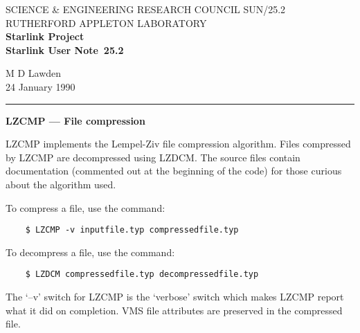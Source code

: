 \pagestyle{myheadings}

\newcommand{\stardoccategory}  {Starlink User Note}
\newcommand{\stardocinitials}  {SUN}
\newcommand{\stardocnumber}    {25.2}
\newcommand{\stardocauthors}   {M D Lawden}
\newcommand{\stardocdate}      {24 January 1990}
\newcommand{\stardoctitle}     {LZCMP --- File compression}

\newcommand{\stardocname}{\stardocinitials /\stardocnumber}
\markright{\stardocname}
\setlength{\textwidth}{160mm}
\setlength{\textheight}{240mm}
\setlength{\topmargin}{-5mm}
\setlength{\oddsidemargin}{0mm}
\setlength{\evensidemargin}{0mm}
\setlength{\parindent}{0mm}
\setlength{\parskip}{\medskipamount}
\setlength{\unitlength}{1mm}


\thispagestyle{empty}
SCIENCE \& ENGINEERING RESEARCH COUNCIL \hfill \stardocname\\
RUTHERFORD APPLETON LABORATORY\\
{\large\bf Starlink Project\\}
{\large\bf \stardoccategory\ \stardocnumber}
\begin{flushright}
\stardocauthors\\
\stardocdate
\end{flushright}
\vspace{-4mm}
\rule{\textwidth}{0.5mm}
\vspace{5mm}
\begin{center}
{\Large\bf \stardoctitle}
\end{center}
\vspace{5mm}

LZCMP implements the Lempel-Ziv file compression algorithm.
Files compressed by LZCMP are decompressed using LZDCM.
The source files contain documentation (commented out at the beginning of the
code) for those curious about the algorithm used.

To compress a file, use the command:
\begin{verbatim}
    $ LZCMP -v inputfile.typ compressedfile.typ
\end{verbatim}
To decompress a file, use the command:
\begin{verbatim}
    $ LZDCM compressedfile.typ decompressedfile.typ
\end{verbatim}
The `--v' switch for LZCMP is the `verbose' switch which makes LZCMP report what
it did on completion.
VMS file attributes are preserved in the compressed file.

